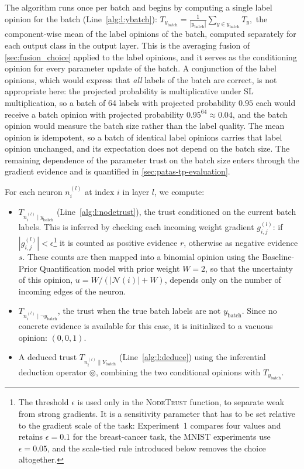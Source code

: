 The algorithm runs once per batch and begins by computing a single label opinion for the batch (Line~\ref{alg:l:ybatch}):
\(
T_{y_\text{batch}} = \frac{1}{|y_\text{batch}|}\sum_{y \in y_\text{batch}} T_y ,
\)
the component-wise mean of the label opinions of the batch, computed separately for each output class in the output layer. This is the averaging fusion of \cref{sec:fusion_choice} applied to the label opinions, and it serves as the conditioning opinion for every parameter update of the batch. A conjunction of the label opinions, which would express that \emph{all} labels of the batch are correct, is not appropriate here: the projected probability is multiplicative under \ac{SL} multiplication, so a batch of 64 labels with projected probability $0.95$ each would receive a batch opinion with projected probability $0.95^{64} \approx 0.04$, and the batch opinion would measure the batch size rather than the label quality. The mean opinion is idempotent, so a batch of identical label opinions carries that label opinion unchanged, and its expectation does not depend on the batch size. The remaining dependence of the parameter trust on the batch size enters through the gradient evidence and is quantified in \cref{sec:patas-tp-evaluation}.

For each neuron \(n_i^{(l)}\) at index \(i\) in layer \(l\), we compute:
\begin{itemize}
    \item \( T_{n_{i}^{(l)} \mid y_\text{batch}} \) (Line~\ref{alg:l:nodetrust}), the trust conditioned on the current batch labels. This is inferred by checking each incoming weight gradient \( g^{(l)}_{i,j} \): if \( |g^{(l)}_{i,j}| < \epsilon\)\footnote{The threshold $\epsilon$ is used only in the \textsc{NodeTrust} function, to separate weak from strong gradients. It is a sensitivity parameter that has to be set relative to the gradient scale of the task: Experiment~1 compares four values and retains $\epsilon = 0.1$ for the breast-cancer task, the MNIST experiments use $\epsilon = 0.05$, and the scale-tied rule introduced below removes the choice altogether.}
 it is counted as positive evidence \( r \), otherwise as negative evidence \( s \). These counts are then mapped into a binomial opinion using the Baseline-Prior Quantification model with prior weight $W = 2$, so that the uncertainty of this opinion, $u = W / (|\mathcal{N}(i)| + W)$, depends only on the number of incoming edges of the neuron.
    \item \( T_{n_{i}^{(l)} \mid \lnot y_\text{batch}} \), the trust when the true batch labels are not \( y_\text{batch} \). Since no concrete evidence is available for this case, it is initialized to a vacuous opinion: \( (0, 0, 1) \).
    \item A deduced trust \( T_{n_{i}^{(l)} \parallel Y_\text{batch}} \) (Line~\ref{alg:l:deduce}) using the inferential deduction operator \( \circledcirc \), combining the two conditional opinions with \( T_{y_\text{batch}} \).
\end{itemize}

